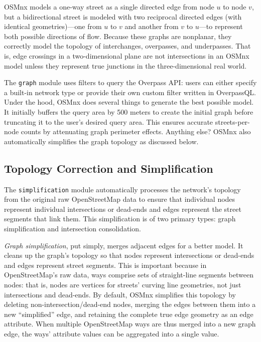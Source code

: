 \documentclass[12pt,letterpaper]{article} %
\begin{document}
OSMnx models a one-way street as a single directed edge from node $u$ to node $v$, but a bidirectional street is modeled with two reciprocal directed edges (with identical geometries)---one from $u$ to $v$ and another from $v$ to $u$---to represent both possible directions of flow. Because these graphs are nonplanar, they correctly model the topology of interchanges, overpasses, and underpasses. That is, edge crossings in a two-dimensional plane are not intersections in an OSMnx model unless they represent true junctions in the three-dimensional real world.

The \texttt{graph} module uses filters to query the Overpass API: users can either specify a built-in network type or provide their own custom filter written in OverpassQL. Under the hood, OSMnx does several things to generate the best possible model. It initially buffers the query area by 500 meters to create the initial graph before truncating it to the user's desired query area. This ensures accurate streets-per-node counts by attenuating graph perimeter effects. Anything else? OSMnx also automatically simplifies the graph topology as discussed below.

\subsection{Topology Correction and Simplification}

The \texttt{simplification} module automatically processes the network's topology from the original raw OpenStreetMap data to ensure that individual nodes represent individual intersections or dead-ends and edges represent the street segments that link them. This simplification is of two primary types: graph simplification and intersection consolidation.

\textit{Graph simplification}, put simply, merges adjacent edges for a better model. It cleans up the graph's topology so that nodes represent intersections or dead-ends and edges represent street segments. This is important because in OpenStreetMap's raw data, ways comprise sets of straight-line segments between nodes: that is, nodes are vertices for streets' curving line geometries, not just intersections and dead-ends. By default, OSMnx simplifies this topology by deleting non-intersection/dead-end nodes, merging the edges between them into a new \enquote{simplified} edge, and retaining the complete true edge geometry as an edge attribute. When multiple OpenStreetMap ways are thus merged into a new graph edge, the ways' attribute values can be aggregated into a single value.
\end{document}
